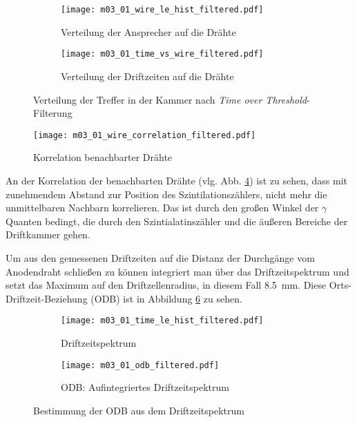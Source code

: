 \documentclass[11pt, ngerman, fleqn, DIV=15, headinclude, BCOR=2cm]{scrreprt}
\begin{document}
\begin{figure}
	\centering
	\begin{subfigure}{0.49 \linewidth}
		\texttt{[image: m03\_01\_wire\_le\_hist\_filtered.pdf]}
		\caption{%
			Verteilung der Ansprecher auf die Drähte
		}
		\label{fig:m03_wire_le_hist_filtered}
	\end{subfigure}
	\begin{subfigure}{0.49 \linewidth}
		\texttt{[image: m03\_01\_time\_vs\_wire\_filtered.pdf]}
		\caption{%
			Verteilung der Driftzeiten auf die Drähte
		}
		\label{fig:m03_time_vs_wire_filtered}
	\end{subfigure}
	\caption{%
		Verteilung der Treffer in der Kammer nach \emph{Time over
		Threshold}-Filterung
	}
	\label{fig:m03_verteilung_in_der_kammer_mit_ToT}
\end{figure}

\begin{figure}
	\centering
	\texttt{[image: m03\_01\_wire\_correlation\_filtered.pdf]}
	\caption{%
		Korrelation benachbarter Drähte
	}
	\label{fig:m03_wire_correlation}
\end{figure}

An der Korrelation der benachbarten Drähte (vlg. Abb.
\ref{fig:m03_wire_correlation}) ist zu sehen, dass mit zunehmendem Abstand zur
Position des Szintilationszählers, nicht mehr die unmittelbaren Nachbarn
korrelieren.
Das ist durch den großen Winkel der $\gamma$ Quanten bedingt, die durch den
Szintialatinszähler und die äußeren Bereiche der Driftkammer gehen.

Um aus den gemessenen Driftzeiten auf die Distanz der Durchgänge vom
Anodendraht schließen zu können integriert man über das Driftzeitspektrum und
setzt das Maximum auf den Driftzellenradius, in diesem Fall
\SI{8.5}{\milli\metre}. Diese Orts-Driftzeit-Beziehung (ODB) ist in Abbildung
\ref{fig:m03_odb_filtered} zu sehen.


\begin{figure}
	\centering
	\begin{subfigure}{0.49 \linewidth}
		\texttt{[image: m03\_01\_time\_le\_hist\_filtered.pdf]}
		\caption{%
			Driftzeitspektrum
		}
		\label{fig:m03_time_le_hist_filtered}
	\end{subfigure}
	\begin{subfigure}{0.49 \linewidth}
		\texttt{[image: m03\_01\_odb\_filtered.pdf]}
		\caption{%
			ODB: Aufintegriertes Driftzeitspektrum
		}
		\label{fig:m03_odb_filtered}
	\end{subfigure}
	\caption{%
		Bestimmung der ODB aus dem Driftzeitspektrum
	}
	\label{fig:m03_odb_bestimmung}
\end{figure}
\end{document}
